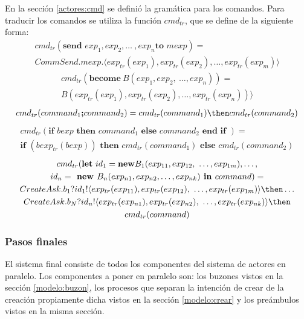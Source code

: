 En la sección \ref{actores:cmd} se definió la gramática para los comandos. Para traducir los comandos se utiliza la función $cmd_{tr}$, que se define de la siguiente forma:
\begin{multline*}
cmd_{tr} (\textbf{send } exp_1, exp_2, \ldots\ , exp_n \textbf{to } mexp) = \\
CommSend.mexp. \langle exp_{tr}(exp_1), exp_{tr}(exp_2), \ldots, exp_{tr}(exp_m) \rangle
\end{multline*}
\begin{multline*}
cmd_{tr} (\textbf{become}\ B(exp_1, exp_2,\ \ldots, exp_n)) = \\
B(exp_{tr}(exp_1), exp_{tr}(exp_2), \ldots, exp_{tr}(exp_n)) \rangle
\end{multline*}
\begin{multline*}
cmd_{tr} (command_1 \textbf{;} command_2) = cmd_{tr}(command_1) \then cmd_{tr}(command_2)
\end{multline*}
\begin{multline*}
cmd_{tr} (\textbf{if } bexp \textbf{ then } command_1 \textbf{ else } command_2 \textbf{ end if }) = \\
\textbf{if } (bexp_{tr}(bexp))\textbf{ then } cmd_{tr}(command_1) \textbf{ else } cmd_{tr}(command_2)
\end{multline*}
\begin{multline*}
cmd_{tr}( \textbf{let}\ id_1 = \textbf{new} B_1(exp_{11}, exp_{12},\ \ldots, exp_{1m}), \ldots, \\
id_n = \textbf{ new }B_n(exp_{n1}, exp_{n2},\ldots, exp_{nk}) \textbf{ in }command) = \\
CreateAsk.b_1?id_1! \langle exp_{tr}(exp_{11}), exp_{tr}(exp_{12}),\ \ldots, exp_{tr}(exp_{1m}) \rangle \then \ldots \\
CreateAsk.b_N?id_n! \langle exp_{tr}(exp_{n1}), exp_{tr}(exp_{n2}),\ \ldots, exp_{tr}(exp_{nk}) \rangle \then  \\ 
cmd_{tr}(command)
\end{multline*}

\subsubsection*{Pasos finales}

El sistema final consiste de todos los componentes del sistema de actores en paralelo. Los componentes a poner en paralelo son: los buzones vistos en la sección \ref{modelo:buzon}, los procesos que separan la intención de crear de la creación propiamente dicha vistos en la sección \ref{modelo:crear} y los preámbulos vistos en la misma sección.

